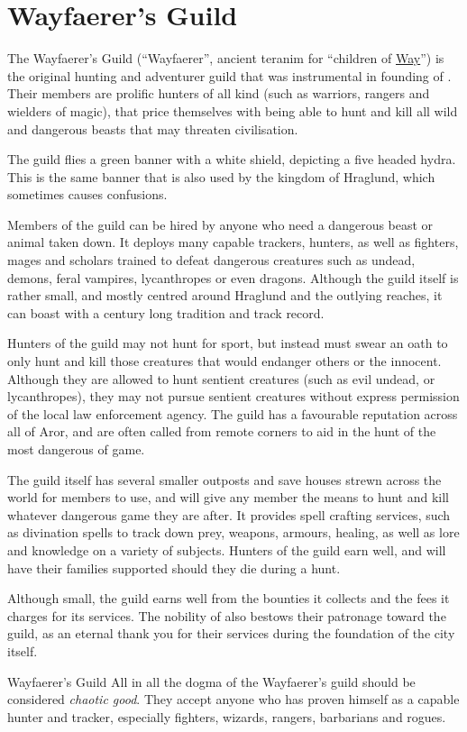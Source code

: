 \section{Wayfaerer's Guild}
\label{sec:Wayfaerers Guild}

The Wayfaerer's Guild (``Wayfaerer'', ancient teranim for ``children of
\hyperref[sec:Eigyr]{Way}'') is the original hunting and adventurer guild that
was instrumental in founding of . Their members are
prolific hunters of all kind (such as warriors, rangers and wielders of
magic), that price themselves with being able to hunt and kill all wild and
dangerous beasts that may threaten civilisation.

The guild flies a green banner with a white shield, depicting a five headed
hydra. This is the same banner that is also used by the kingdom of Hraglund,
which sometimes causes confusions.

Members of the guild can be hired by anyone who need a dangerous beast or
animal taken down. It deploys many capable trackers, hunters, as well as
fighters, mages and scholars trained to defeat dangerous creatures such as
undead, demons, feral vampires, lycanthropes or even dragons. Although the
guild itself is rather small, and mostly centred around Hraglund and the
outlying reaches, it can boast with a century long tradition and track record.

Hunters of the guild may not hunt for sport, but instead must swear an oath to
only hunt and kill those creatures that would endanger others or the innocent.
Although they are allowed to hunt sentient creatures (such as evil undead, or
lycanthropes), they may not pursue sentient creatures without express permission
of the local law enforcement agency. The guild has a favourable reputation
across all of Aror, and are often called from remote corners to aid in the
hunt of the most dangerous of game.

The guild itself has several smaller outposts and save houses strewn across the
world for members to use, and will give any member the means to hunt and kill
whatever dangerous game they are after. It provides spell crafting services,
such as divination spells to track down prey, weapons, armours, healing, as well
as lore and knowledge on a variety of subjects. Hunters of the guild earn well,
and will have their families supported should they die during a hunt.

Although small, the guild earns well from the bounties it collects and the fees
it charges for its services. The nobility of  also bestows
their patronage toward the guild, as an eternal thank you for their services
during the foundation of the city itself.

\begin{35e}{Wayfaerer's Guild}
  All in all the dogma of the Wayfaerer's guild should be considered
  \emph{chaotic good}. They accept anyone who has proven himself as a capable
  hunter and tracker, especially fighters, wizards, rangers, barbarians and
  rogues.
\end{35e}

